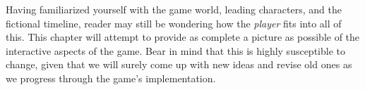 
Having familiarized yourself with the game world, leading characters, and the fictional timeline, reader may still be wondering how the {\it player} fits into all of this. This chapter will attempt to provide as complete a picture as possible of the interactive aspects of the game. Bear in mind that this is highly susceptible to change, given that we will surely come up with new ideas and revise old ones as we progress through the game's implementation.


\page 
\page 
\page 
\page 
\page 
\page 


\StopChapter

